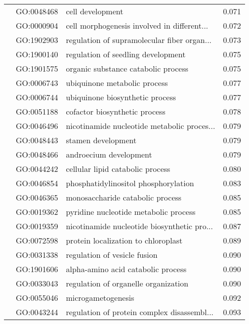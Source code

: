 \begin{longtable}{lllr}
   & GO:0048468 &                             cell development &         0.071 \\
   & GO:0000904 &  cell morphogenesis involved in different... &         0.072 \\
   & GO:1902903 &  regulation of supramolecular fiber organ... &         0.073 \\
   & GO:1900140 &           regulation of seedling development &         0.075 \\
   & GO:1901575 &          organic substance catabolic process &         0.075 \\
   & GO:0006743 &                 ubiquinone metabolic process &         0.077 \\
   & GO:0006744 &              ubiquinone biosynthetic process &         0.077 \\
   & GO:0051188 &                cofactor biosynthetic process &         0.078 \\
   & GO:0046496 &  nicotinamide nucleotide metabolic proces... &         0.079 \\
   & GO:0048443 &                           stamen development &         0.079 \\
   & GO:0048466 &                       androecium development &         0.079 \\
   & GO:0044242 &             cellular lipid catabolic process &         0.080 \\
   & GO:0046854 &         phosphatidylinositol phosphorylation &         0.083 \\
   & GO:0046365 &             monosaccharide catabolic process &         0.085 \\
   & GO:0019362 &        pyridine nucleotide metabolic process &         0.085 \\
   & GO:0019359 &  nicotinamide nucleotide biosynthetic pro... &         0.087 \\
   & GO:0072598 &          protein localization to chloroplast &         0.089 \\
   & GO:0031338 &                 regulation of vesicle fusion &         0.090 \\
   & GO:1901606 &           alpha-amino acid catabolic process &         0.090 \\
   & GO:0033043 &         regulation of organelle organization &         0.090 \\
   & GO:0055046 &                           microgametogenesis &         0.092 \\
   & GO:0043244 &  regulation of protein complex disassembl... &         0.093 \\

\end{longtable}
